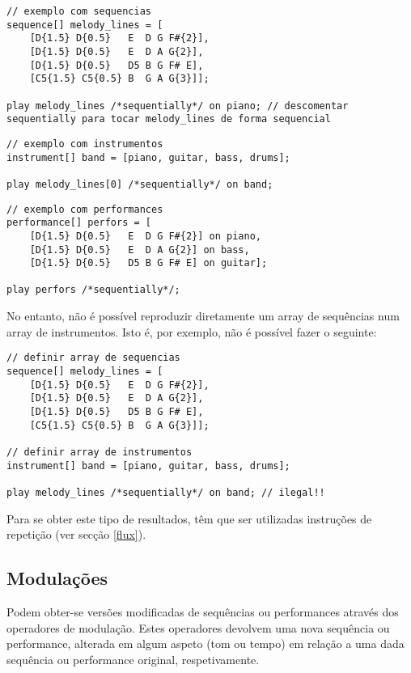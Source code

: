 \documentclass{article}
\begin{document}
\begin{lstlisting} 
// exemplo com sequencias
sequence[] melody_lines = [
    [D{1.5} D{0.5}   E  D G F#{2}], 
    [D{1.5} D{0.5}   E  D A G{2}],
    [D{1.5} D{0.5}   D5 B G F# E],
    [C5{1.5} C5{0.5} B  G A G{3}]];

play melody_lines /*sequentially*/ on piano; // descomentar sequentially para tocar melody_lines de forma sequencial
\end{lstlisting}

\begin{lstlisting} 
// exemplo com instrumentos
instrument[] band = [piano, guitar, bass, drums];

play melody_lines[0] /*sequentially*/ on band;
\end{lstlisting}

\begin{lstlisting} 
// exemplo com performances
performance[] perfors = [
    [D{1.5} D{0.5}   E  D G F#{2}] on piano, 
    [D{1.5} D{0.5}   E  D A G{2}] on bass,
    [D{1.5} D{0.5}   D5 B G F# E] on guitar];
    
play perfors /*sequentially*/;
\end{lstlisting}
No entanto, não é possível reproduzir diretamente um array de sequências num array de instrumentos. Isto é, por exemplo, não é possível fazer o seguinte:
\begin{lstlisting} 
// definir array de sequencias
sequence[] melody_lines = [
    [D{1.5} D{0.5}   E  D G F#{2}], 
    [D{1.5} D{0.5}   E  D A G{2}],
    [D{1.5} D{0.5}   D5 B G F# E],
    [C5{1.5} C5{0.5} B  G A G{3}]];

// definir array de instrumentos
instrument[] band = [piano, guitar, bass, drums];

play melody_lines /*sequentially*/ on band; // ilegal!!
\end{lstlisting}
Para se obter este tipo de resultados, têm que ser utilizadas instruções de repetição (ver secção \ref{flux}).

\subsection{Modulações}
Podem obter-se versões modificadas de sequências ou performances através dos operadores de modulação. Estes operadores devolvem uma nova sequência ou performance, alterada em algum aspeto (tom ou tempo) em relação a uma dada sequência  ou performance original, respetivamente.
\end{document}
